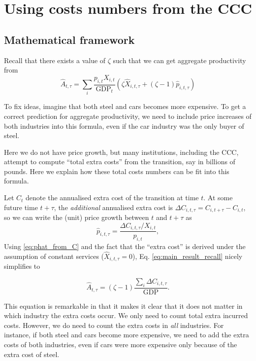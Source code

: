 \documentclass[11pt]{article}
\begin{document}
\section{Using costs numbers from the CCC}

\subsection{Mathematical framework}

Recall that there exists a value of $\zeta$  such that we can get aggregate productivity from
\begin{equation}
\hat{A}_{t,\tau} = \sum_i \frac{p_{i,t}X_{i,t}}{\text{GDP}_{t}} \left(\zeta \hat{X}_{i,t,\tau} + (\zeta - 1) \hat{p}_{i,t,\tau} \right)
\label{eq:main_result_recall}
\end{equation}

To fix ideas, imagine that both steel and cars becomes more expensive. To get a correct prediction for aggregate productivity, we need to include price increases of both industries into this formula, even if the car industry was the only buyer of steel. 


Here we do not have price growth, but many institutions, including the CCC, attempt to compute ``total extra costs'' from the transition, say in billions of pounds. Here we explain how these total costs numbers can be fit into this formula.

Let $C_t$ denote the annualised extra cost of the transition at time $t$. At some future time $t +\tau$, the \textit{additional} annualised extra cost is $\Delta C_{i,t,\tau} = C_{i,t+\tau} - C_{i,t}$, so we can write the (unit) price growth between $t$ and $t+\tau$ as 
\begin{equation}
\hat{p}_{i,t,\tau} = \frac{\Delta C_{i,t,\tau}/X_{i,t}}{p_{i,t}},
\label{eq:phat_from_C}    
\end{equation}
Using \eqref{eq:phat_from_C} and the fact that the ``extra cost'' is derived under the assumption of constant services ($\hat{X}_{i,t,\tau}=0$), Eq. \ref{eq:main_result_recall} nicely simplifies to
   
\begin{equation}
 \hat{A}_{t,\tau} = (\zeta - 1)  \frac{\sum_i \Delta C_{i,t,\tau}}{\text{GDP}}.
\label{eq_ahat_t_tau_ccc}
\end{equation}

This equation is remarkable in that it makes it clear that it does not matter in which industry the extra costs occur. We only need to count total extra incurred costs. However, we do need to count the extra costs in \textit{all} industries. For instance, if both steel and cars become more expensive, we need to add the extra costs of both industries, even if cars were more expensive only because of the extra cost of steel.
\end{document}
